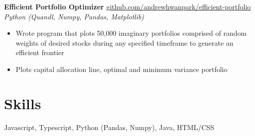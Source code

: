\documentclass[margin]{res}
\begin{document}
\begin{resume}
	{\bf Efficient Portfolio Optimizer} \hfill \href{https://github.com/andrewhwanpark/efficient-portfolio}{github.com/andrewhwanpark/efficient-portfolio}\\
	{\it Python (Quandl, Numpy, Pandas, Matplotlib)}
	\begin{itemize} \itemsep -2pt
		\item Wrote program that plots 50,000 imaginary portfolios comprised of random weights of desired stocks during any specified timeframe to generate an efficient frontier
		\item Plots capital allocation line, optimal and minimum variance portfolio
	\end{itemize}
	
	
	\section{Skills} 
	Javascript, Typescript, Python (Pandas, Numpy), Java, HTML/CSS
	
	
\end{resume} 
\end{document}
